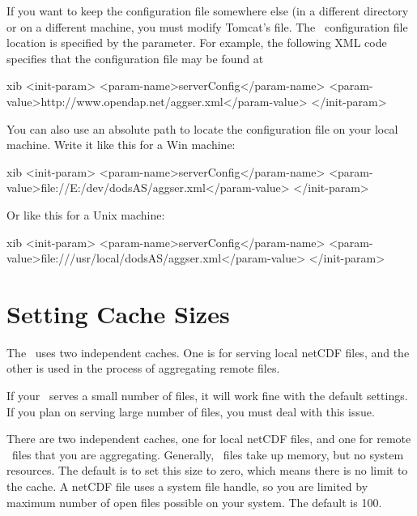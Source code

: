 \documentclass{dods-book}
\begin{document}
If you want to keep the configuration file somewhere else (in a
different directory or on a different machine, you must
modify Tomcat's  file.  The \aggser\ configuration file
location is specified by the  parameter.  For
example, the following XML code specifies that the configuration file
may be found at 

\begin{vcode}{xib}
<init-param>
  <param-name>serverConfig</param-name>
  <param-value>http://www.opendap.net/aggser.xml</param-value>
</init-param>
\end{vcode}

You can also use an absolute path to locate the configuration file on
your local machine.  Write it like this for a Win machine:

\begin{vcode}{xib}
<init-param>
  <param-name>serverConfig</param-name>
  <param-value>file://E:/dev/dodsAS/aggser.xml</param-value>
</init-param>
\end{vcode}

Or like this for a Unix machine:

\begin{vcode}{xib}
<init-param>
  <param-name>serverConfig</param-name>
  <param-value>file:///usr/local/dodsAS/aggser.xml</param-value>
</init-param>
\end{vcode}


\section{Setting Cache Sizes}


The \AggServer\ uses two independent caches.  One is for serving local
netCDF files, and the other is used in the process of aggregating
remote files.

If your \aggser\ serves a small number of files, it will work fine
with the default settings.  If you plan on serving large number of files,
you must deal with this issue.

There are two independent caches, one for local netCDF files, and one
for remote \opendap\ files that you are aggregating. Generally,
\opendap\ files take up memory, but no system resources. The default
is to set this size to zero, which means there is no limit to the
cache.  A netCDF file uses a system file handle, so you are limited by
maximum number of open files possible on your system. The default is
100.
\end{document}
